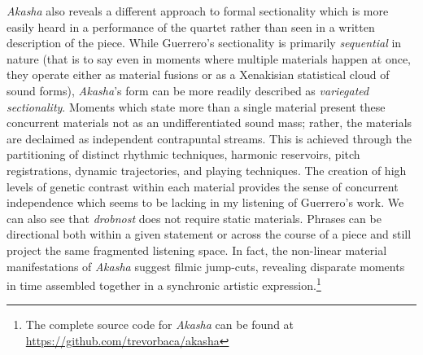 \textit{Akasha} also reveals a different approach to formal sectionality which is more easily heard in a performance of the quartet rather than seen in a written description of the piece. While Guerrero's sectionality is primarily \textit{sequential} in nature (that is to say even in moments where multiple materials happen at once, they operate either as material fusions or as a Xenakisian statistical cloud of sound forms), \textit{Akasha}'s form can be more readily described as \textit{variegated sectionality}. Moments which state more than a single material present these concurrent materials not as an undifferentiated sound mass; rather, the materials are declaimed as independent contrapuntal streams. This is achieved through the partitioning of distinct rhythmic techniques, harmonic reservoirs, pitch registrations, dynamic trajectories, and playing techniques. The creation of high levels of genetic contrast within each material provides the sense of concurrent independence which seems to be lacking in my listening of Guerrero's work. We can also see that \textit{drobnost} does not require static materials. Phrases can be directional both within a given statement or across the course of a piece and still project the same fragmented listening space. In fact, the non-linear material manifestations of \textit{Akasha} suggest filmic jump-cuts, revealing disparate moments in time assembled together in a synchronic artistic expression.\footnote{The complete source code for \textit{Akasha} can be found at \url{https://github.com/trevorbaca/akasha}} 